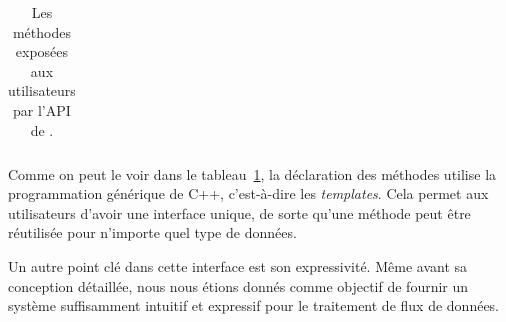 \begin{table}[h]
{\begin{tabular}{|l|l|p{8cm}|}

\end{tabular}
}
\caption{Les m\'ethodes expos\'ees aux utilisateurs par l'API de \ppff.}
\label{methodes_api.tab}
\end{table}

Comme on peut le voir dans le tableau~\ref{methodes_api.tab}, la d\'eclaration des m\'ethodes utilise la programmation g\'en\'erique de C++, c'est-\`a-dire les \emph{templates}. Cela permet aux utilisateurs d'avoir une interface unique, de sorte qu'une m\'ethode peut \^etre r\'eutilis\'ee pour n'importe quel type de donn\'ees.


Un autre point cl\'e dans cette interface est son expressivit\'e. M\^eme avant sa conception d\'etaill\'ee, nous nous \'etions donn\'es comme objectif de fournir un syst\`eme suffisamment intuitif et expressif pour le traitement de flux de donn\'ees. 


